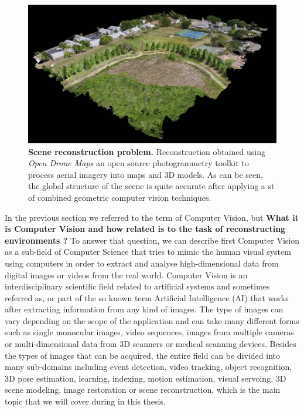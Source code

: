 \begin{figure}[t!]
	\centering
	\includegraphics[width=\textwidth]{main/introduction/images/odm_reconstruction.jpg}
	\caption[Scene reconstruction problem]{\textbf{Scene reconstruction problem.} Reconstruction obtained using \textit{Open Drone Maps} an open source photogrammetry toolkit to process aerial imagery into maps and 3D models. As can be seen, the global structure of the scene is quite accurate after applying a st of combined geometric computer vision techniques. }
	\label{fig:intro_odm_reconstruction}
\end{figure}

In the previous section we referred to the term of Computer Vision, but \textbf{What it is Computer Vision and how related is to the task of reconstructing environments ?} To answer that question, we can describe first Computer Vision as a sub-field of Computer Science that tries to mimic the human visual system using computers in order to extract and analyse high-dimensional data from digital images or videos from the real world. Computer Vision is an interdisciplinary scientific field related to artificial systems and sometimes referred as, or part of the so known term Artificial Intelligence (AI) that works after extracting information from any kind of images. The type of images can vary depending on the scope of the application and can take many different forms such as single monocular images, video sequences, images from multiple cameras or multi-dimensional data from 3D scanners or medical scanning devices. Besides the types of images that can be acquired, the entire field can be divided into many sub-domains including event detection, video tracking, object recognition, 3D pose estimation, learning, indexing, motion estimation, visual servoing, 3D scene modeling, image restoration or scene reconstruction, which is the main topic that we will cover during in this thesis.

